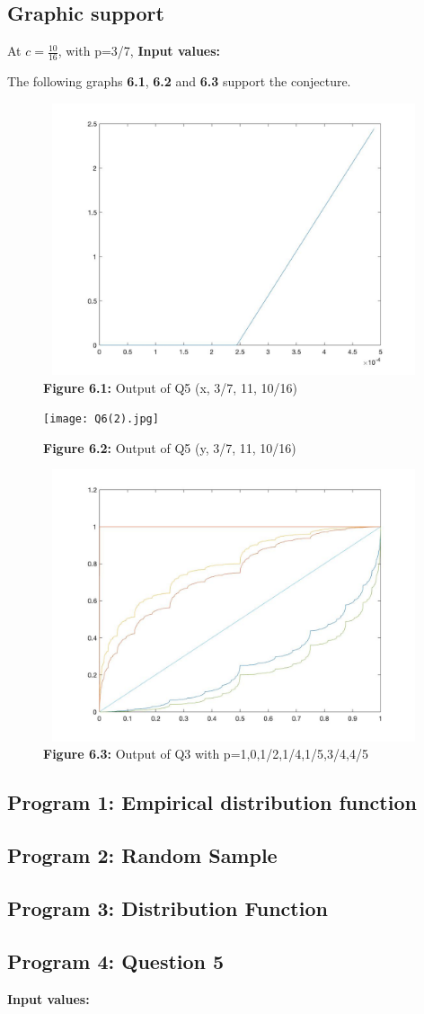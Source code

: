 \documentclass[11pt]{article}
\begin{document}
\subsection*{Graphic support}
At $c=\frac{10}{16}$, with p=3/7, 
\textbf{Input values:} 

The following graphs \textbf{6.1}, \textbf{6.2} and \textbf{6.3} support the conjecture.
\begin{figure}[H]
\includegraphics[width=13cm,height=8cm]{Q6(1).jpg}
\caption{\textbf{Figure 6.1:} Output of Q5 (x, 3/7, 11, 10/16)}
\end{figure}
\begin{figure}
\texttt{[image: Q6(2).jpg]}
\caption{\textbf{Figure 6.2:} Output of Q5 (y, 3/7, 11, 10/16)}
\end{figure}
\begin{figure}
\includegraphics[width=13cm, height=8cm]{Q6(3).jpg}
\caption{\textbf{Figure 6.3:} Output of Q3 with p=1,0,1/2,1/4,1/5,3/4,4/5}
\end{figure}
\subsection*{Program 1: Empirical distribution function}

\subsection*{Program 2: Random Sample}

\subsection*{Program 3: Distribution Function}

\subsection*{Program 4: Question 5}

\textbf{Input values:}

\end{document}
